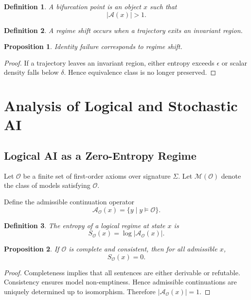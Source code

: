 \documentclass[12pt]{article}
\newtheorem{proposition}{Proposition}
\newtheorem{definition}{Definition}
\begin{document}
\begin{definition}
A bifurcation point is an object $x$ such that
\[
|\mathcal{A}(x)| > 1.
\]
\end{definition}

\begin{definition}
A regime shift occurs when a trajectory exits an invariant region.
\end{definition}

\begin{proposition}
Identity failure corresponds to regime shift.
\end{proposition}

\begin{proof}
If a trajectory leaves an invariant region, either entropy exceeds $\epsilon$ or scalar density falls below $\delta$. Hence equivalence class is no longer preserved.
\end{proof}

\section{Analysis of Logical and Stochastic AI}

\subsection{Logical AI as a Zero-Entropy Regime}

Let $\mathcal{O}$ be a finite set of first-order axioms over signature $\Sigma$. Let $\mathcal{M}(\mathcal{O})$ denote the class of models satisfying $\mathcal{O}$.

Define the admissible continuation operator
\[
\mathcal{A}_{\mathcal{O}}(x) = \{ y \mid y \models \mathcal{O} \}.
\]

\begin{definition}
The entropy of a logical regime at state $x$ is
\[
S_{\mathcal{O}}(x) = \log |\mathcal{A}_{\mathcal{O}}(x)|.
\]
\end{definition}

\begin{proposition}
If $\mathcal{O}$ is complete and consistent, then for all admissible $x$,
\[
S_{\mathcal{O}}(x) = 0.
\]
\end{proposition}

\begin{proof}
Completeness implies that all sentences are either derivable or refutable. Consistency ensures model non-emptiness. Hence admissible continuations are uniquely determined up to isomorphism. Therefore $|\mathcal{A}_{\mathcal{O}}(x)| = 1$.
\end{proof}
\end{document}
